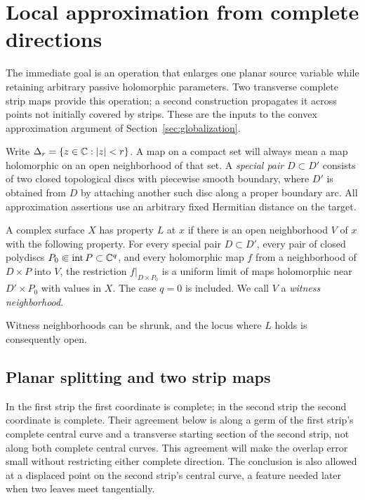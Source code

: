 \section{Local approximation from complete directions}\label{sec:local}

The immediate goal is an operation that enlarges one planar source
variable while retaining arbitrary passive holomorphic parameters.
Two transverse complete strip maps provide this operation; a second
construction propagates it across points not initially covered by
strips. These are the inputs to the convex approximation argument
of Section~\ref{sec:globalization}.

Write $\Delta_r=\{z\in\mathbb C:|z|<r\}$. A map on a compact set will
always mean a map holomorphic on an open neighborhood of that set.
A \emph{special pair} $D\subset D'$ consists of two closed topological
discs with piecewise smooth boundary, where $D'$ is obtained from $D$
by attaching another such disc along a proper boundary arc. All
approximation assertions use an arbitrary fixed Hermitian distance
on the target.

\begin{definition}\label{loc:property}
A complex surface $X$ has property $L$ at $x$ if there is an open
neighborhood $V$ of $x$ with the following property. For every special
pair $D\subset D'$, every pair of closed polydiscs
$P_0\Subset\operatorname{int}P\subset\mathbb C^q$, and every holomorphic map
$f$ from a neighborhood of $D\times P$ into $V$, the restriction
$f|_{D\times P_0}$ is a uniform limit of maps holomorphic near
$D'\times P_0$ with values in $X$.
The case $q=0$ is included. We call $V$ a \emph{witness neighborhood}.
\end{definition}

Witness neighborhoods can be shrunk, and the locus where $L$ holds
is consequently open.

\subsection{Planar splitting and two strip maps}

In the first strip the first coordinate is complete; in the second
strip the second coordinate is complete. Their agreement below is
along a germ of the first strip's complete central curve and a transverse
starting section of the second strip, not along both complete
central curves. This agreement will make the overlap error small
without restricting either complete direction. The conclusion is
also allowed at a displaced point on the second strip's central
curve, a feature needed later when two leaves meet tangentially.


